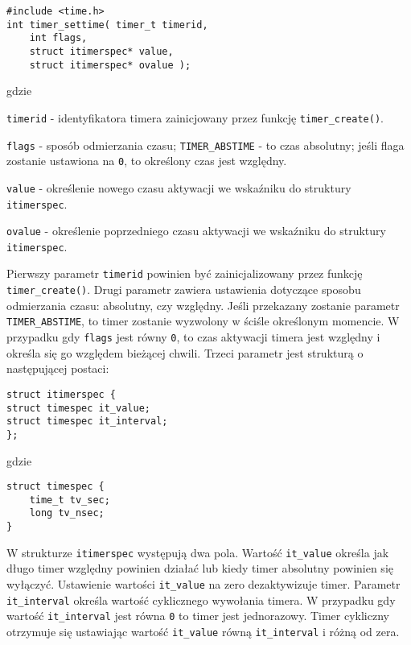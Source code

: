 \begin{lstlisting}[style=MyCStyle] 
#include <time.h>
int timer_settime( timer_t timerid,
	int flags,
	struct itimerspec* value,
	struct itimerspec* ovalue );
\end{lstlisting}

\noindent 
gdzie 

\begin{myitemize}
\item[] \lstinline[style=MyCStyle]{timerid} - identyfikatora timera zainicjowany przez funkcję \lstinline[style=MyCStyle]{timer_create()}.
\item[] \lstinline[style=MyCStyle]{flags} - sposób odmierzania czasu; \lstinline[style=MyCStyle]{TIMER_ABSTIME} - to czas absolutny; jeśli flaga zostanie ustawiona na \lstinline[style=MyCStyle]{0}, to określony czas jest względny.
\item[] \lstinline[style=MyCStyle]{value} - określenie nowego czasu aktywacji we wskaźniku do struktury \lstinline[style=MyCStyle]{itimerspec}.
\item[] \lstinline[style=MyCStyle]{ovalue} - określenie poprzedniego czasu aktywacji we wskaźniku do struktury \lstinline[style=MyCStyle]{itimerspec}.
\end{myitemize}

Pierwszy parametr \lstinline[style=MyCStyle]{timerid} powinien być zainicjalizowany przez funkcję \lstinline[style=MyCStyle]{timer_create()}. Drugi parametr zawiera ustawienia dotyczące sposobu odmierzania czasu: absolutny, czy względny. Jeśli przekazany zostanie parametr \lstinline[style=MyCStyle]{TIMER_ABSTIME}, to timer zostanie wyzwolony w ściśle określonym momencie. W przypadku gdy \lstinline[style=MyCStyle]{flags} jest równy \lstinline[style=MyCStyle]{0}, to czas aktywacji timera jest względny i określa się go względem bieżącej chwili. Trzeci parametr jest strukturą o następującej postaci: 

\begin{lstlisting}[style=MyCStyle] 
struct itimerspec {
struct timespec it_value;
struct timespec it_interval;
};
\end{lstlisting}

\noindent 
gdzie
 
\begin{lstlisting}[style=MyCStyle] 
struct timespec {
	time_t tv_sec;
	long tv_nsec;
}
\end{lstlisting}

W strukturze \lstinline[style=MyCStyle]{itimerspec} występują dwa pola. Wartość \lstinline[style=MyCStyle]{it_value} określa jak długo timer względny powinien działać lub kiedy timer absolutny powinien się wyłączyć. Ustawienie wartości \lstinline[style=MyCStyle]{it_value} na zero dezaktywizuje timer. Parametr \lstinline[style=MyCStyle]{it_interval} określa wartość cyklicznego wywołania timera. W przypadku gdy wartość \lstinline[style=MyCStyle]{it_interval} jest równa \lstinline[style=MyCStyle]{0} to timer jest jednorazowy. Timer cykliczny otrzymuje się ustawiając wartość \lstinline[style=MyCStyle]{it_value} równą \lstinline[style=MyCStyle]{it_interval} i różną od zera. 

